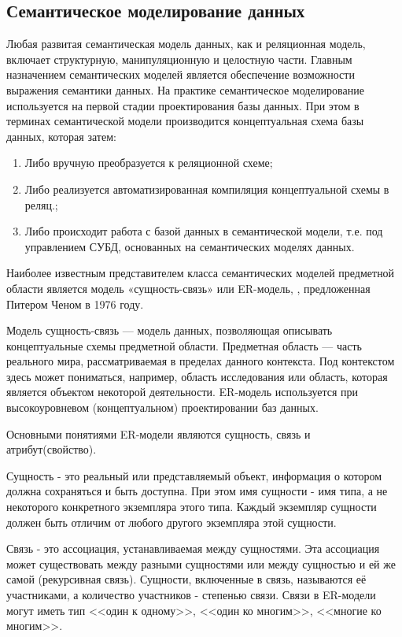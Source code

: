 \newpage

\subsection{Семантическое моделирование данных}

Любая развитая семантическая модель данных, как и реляционная модель, включает структурную, манипуляционную и целостную части. Главным назначением семантических моделей является обеспечение возможности выражения семантики данных. На практике семантическое моделирование используется на первой стадии проектирования базы данных. При этом в терминах семантической модели производится концептуальная схема базы данных, которая затем:
\begin{enumerate}
	\item Либо вручную преобразуется к реляционной схеме;
	\item Либо реализуется автоматизированная компиляция концептуальной схемы в реляц.;
	\item Либо происходит работа с базой данных в семантической модели, т.е. под управлением СУБД, основанных на семантических моделях данных. 
\end{enumerate}

Наиболее известным представителем класса семантических моделей предметной области является модель «сущность-связь» или ER-модель, , предложенная Питером Ченом в 1976 году.

Модель сущность-связь — модель данных, позволяющая описывать концептуальные схемы предметной области. Предметная область — часть реального мира, рассматриваемая в пределах данного контекста. Под контекстом здесь может пониматься, например, область исследования или область, которая является объектом некоторой деятельности. ER-модель используется при высокоуровневом (концептуальном) проектировании баз данных.

Основными понятиями ER-модели являются сущность, связь и атрибут(свойство).

Сущность - это реальный или представляемый объект, информация о котором должна сохраняться и быть доступна. При этом имя сущности - имя типа, а не некоторого конкретного экземпляра этого типа. Каждый экземпляр сущности должен быть отличим от любого другого экземпляра этой сущности.

Связь - это ассоциация, устанавливаемая между сущностями. Эта ассоциация может существовать между разными сущностями или между сущностью и ей же самой (рекурсивная связь). Сущности, включенные в связь, называются её участниками, а количество участников - степенью связи. Связи в ER-модели могут иметь тип <<один к одному>>, <<один ко многим>>, <<многие ко многим>>.

